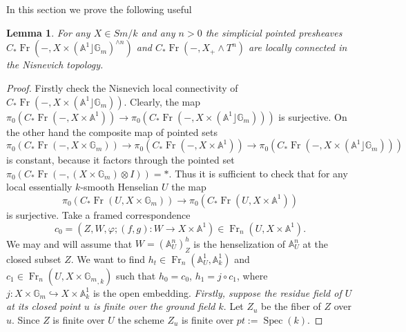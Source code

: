 \documentclass[a4paper,11pt,reqno]{amsart}
\newtheorem{lemma}[theorem]{Lemma}
\begin{document}
\appendix\section{}

In this section we prove the following useful

\begin{lemma}\label{l:connectivity}
For any $X\in Sm/k$ and any $n>0$ the simplicial pointed presheaves
$C_*{\operatorname{Fr}}(-,X\times ({\mathbb{A}}^1\rfloor\mathbb G_m)^{\wedge n})$ and
$C_*{\operatorname{Fr}}(-,X_+\wedge T^n)$ are locally connected in the Nisnevich
topology.
\end{lemma}

\begin{proof}
Firstly check the Nisnevich local connectivity of $C_*{\operatorname{Fr}}(-,X\times
({\mathbb{A}}^1\rfloor\mathbb G_m))$. Clearly, the map $\pi_0(C_*{\operatorname{Fr}}(-,X\times
{\mathbb{A}}^1))\to\pi_0(C_*{\operatorname{Fr}}(-,X\times({\mathbb{A}}^1\rfloor\mathbb G_m)))$ is
surjective. On the other hand the composite map of pointed sets
   $$\pi_0(C_*{\operatorname{Fr}}(-,X\times {{\mathbb{G}_m}}))\to\pi_0(C_*{\operatorname{Fr}}(-,X\times{\mathbb{A}}^1))\to\pi_0(C_*{\operatorname{Fr}}(-,X\times({\mathbb{A}}^1\rfloor\mathbb G_m)))$$
is constant, because it factors through the pointed set
$\pi_0(C_*{\operatorname{Fr}}(-,(X\times {{\mathbb{G}_m}})\otimes I))=*$. Thus it is sufficient
to check that for any local essentially $k$-smooth Henselian $U$ the
map
\begin{equation}\label{eq:connectivity}
\pi_0(C_*{\operatorname{Fr}}(U,X\times {{\mathbb{G}_m}}))  \to  \pi_0(C_*{\operatorname{Fr}}(U,X\times {\mathbb{A}}^1))
\end{equation}
is surjective. Take a framed correspondence
   $$c_0=(Z,W, {\varphi}; (f,g):W\to X\times {\mathbb{A}}^1)\in {\operatorname{Fr}}_n(U,X\times {\mathbb{A}}^1).$$
We may and will assume that $W=({\mathbb{A}}^n_U)^h_Z$ is the henselization of
${\mathbb{A}}^n_U$ at the closed subset $Z$. We want to find $h_t\in
{\operatorname{Fr}}_n({\mathbb{A}}^1_U,{\mathbb{A}}^1_k)$ and $c_1\in {\operatorname{Fr}}_n(U,X\times {{\mathbb{G}_m}}_{,k})$ such
that $h_0=c_0$, $h_{1}=j \circ c_1$, where $j:X\times {{\mathbb{G}_m}}
\hookrightarrow X\times {\mathbb{A}}^1_k$  is the open embedding. {\it
Firstly, suppose the residue field of $U$ at its closed point $u$ is
finite over the ground field $k$}. Let $Z_u$ be the fiber of $Z$
over $u$. Since $Z$ is finite over $U$  the scheme $Z_u$ is finite
over $pt:=\operatorname{Spec}(k)$.


\end{proof}
\end{document}
